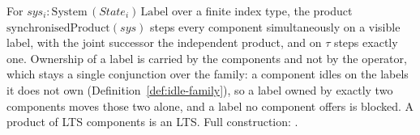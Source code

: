 \begin{definition}
  \label{def:syncproduct}
  \leanok
  For $sys_i : \mathrm{System}\,(State_i)\,\mathrm{Label}$ over a finite index type, the product $\mathrm{synchronisedProduct}(sys)$ steps every component simultaneously on a visible label, with the joint successor the independent product, and on $\tau$ steps exactly one.
  Ownership of a label is carried by the components and not by the operator, which stays a single conjunction over the family: a component idles on the labels it does not own (Definition~\ref{def:idle-family}), so a label owned by exactly two components moves those two alone, and a label no component offers is blocked.
  A product of LTS components is an LTS.
  Full construction: .
\end{definition}
